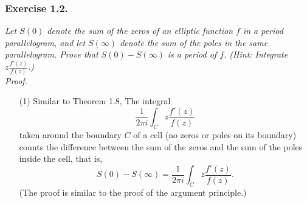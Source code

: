\documentclass{article}
\begin{document}



\subsubsection*{Exercise 1.2.}
\emph{Let $S(0)$ denote the sum of the zeros of an elliptic function $f$
in a period parallelogram,
and let $S(\infty)$ denote the sum of the poles in the same parallelogram.
Prove that $S(0) - S(\infty)$ is a period of $f$.
(Hint: Integrate $z \frac{f'(z)}{f(z)}$.)} \\



\emph{Proof.}
\begin{enumerate}
\item[(1)]
  Similar to Theorem 1.8,
  The integral
  \[
    \frac{1}{2\pi i} \int_{C} z \frac{f'(z)}{f(z)}
  \]
  taken around the boundary $C$ of a cell (no zeros or poles on its boundary)
  counts the difference between
  the sum of the zeros and the sum of the poles inside the cell, that is,
  \[
    S(0) - S(\infty) = \frac{1}{2\pi i} \int_{C} z \frac{f'(z)}{f(z)}.
  \]
  (The proof is similar to the proof of the argument principle.)


\end{enumerate}
\end{document}
